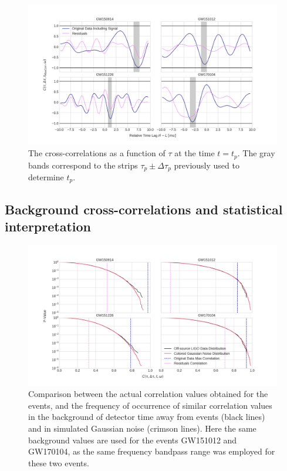 \documentclass[a4paper,11pt]{article}
\begin{document}
\begin{figure}[h]
  \centering
    \includegraphics[width=\columnwidth]{AllMaxCorrVsTimeShift.png}
\caption{The cross-correlations as a function of $\tau$ at the time $t=t_p$. The gray bands correspond to the strips $\tau_p\pm \Delta \tau_p$ previously used to determine $t_p$.}
\label{fig:CorrVsTimeShift}
\end{figure}





\subsection{Background cross-correlations and statistical interpretation}
\label{sec:BkgStt}

\begin{figure}[ht]
  \centering
    \includegraphics[width=\columnwidth]{AllBackgrounds.png}
\caption{Comparison between the actual correlation values obtained for the events, and the frequency of occurrence of similar correlation values in the background of detector time away from events (black lines) and in simulated Gaussian noise (crimson lines). Here the same background values are used for the events GW151012 and GW170104, as the same frequency bandpass range was employed for these two events.}
\label{fig:Backgrounds}
\end{figure}
\end{document}
